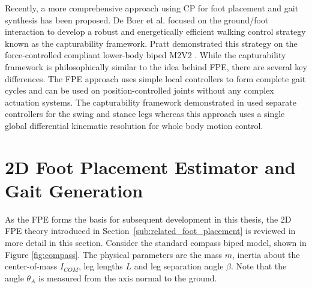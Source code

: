 Recently, a more comprehensive approach using CP for foot placement and gait synthesis has been proposed. De Boer et al. \cite{DeBoer:2012wp,Koolen2012} focused on the ground/foot interaction to develop a robust and energetically efficient walking control strategy known as the capturability framework. Pratt demonstrated this strategy on the force-controlled compliant lower-body biped M2V2 \cite{Pratt2008,Pratt2012}. While the capturability framework is philosophically similar to the idea behind FPE, there are several key differences. The FPE approach uses simple local controllers to form complete gait cycles and can be used on position-controlled joints without any complex actuation systems. The capturability framework demonstrated in \cite{Koolen2012,Pratt2012} used separate controllers for the swing and stance legs whereas this approach uses a single global differential kinematic resolution for whole body motion control.








\section{2D Foot Placement Estimator and Gait Generation} %
\label{sec:fpe_algorithm}
As the FPE forms the basis for subsequent development in this thesis, the 2D FPE theory \cite{Wight:2008ii,Wight:2008vt} introduced in Section~\ref{sub:related_foot_placement} is reviewed in more detail in this section. Consider the standard compass biped model, shown in Figure \ref{fig:compass}. The physical parameters are the mass $m$, inertia about the center-of-mass $I_{COM}$, leg lengths $L$ and leg separation angle $\beta$. Note that the angle $\theta_A$ is measured from the axis normal to the ground. 

